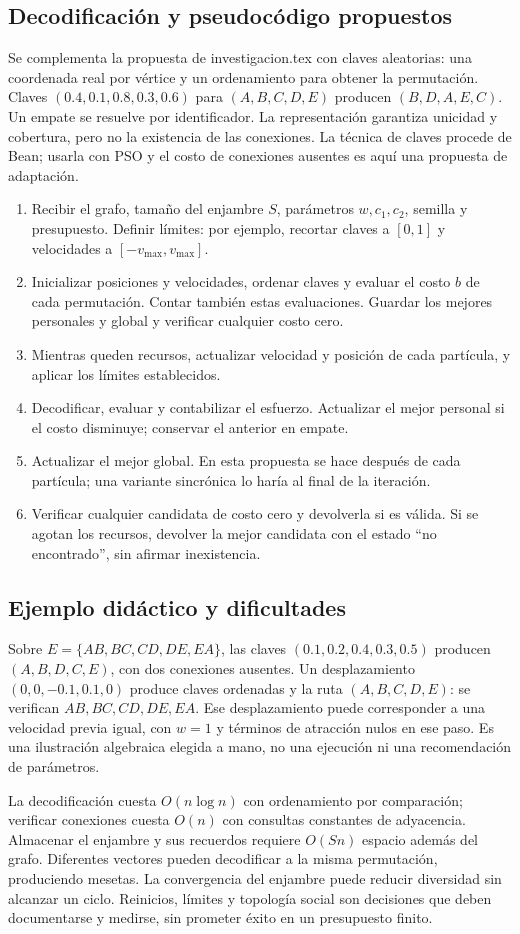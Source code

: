 \subsection{Decodificación y pseudocódigo propuestos}
Se complementa la propuesta de investigacion.tex con claves aleatorias: una coordenada real por vértice y un ordenamiento para obtener la permutación. Claves $(0.4,0.1,0.8,0.3,0.6)$ para $(A,B,C,D,E)$ producen $(B,D,A,E,C)$. Un empate se resuelve por identificador. La representación garantiza unicidad y cobertura, pero no la existencia de las conexiones. La técnica de claves procede de Bean; usarla con PSO y el costo de conexiones ausentes es aquí una propuesta de adaptación.\cite{de13}
\begin{enumerate}
\item Recibir el grafo, tamaño del enjambre $S$, parámetros $w,c_1,c_2$, semilla y presupuesto. Definir límites: por ejemplo, recortar claves a $[0,1]$ y velocidades a $[-v_{\max},v_{\max}]$.
\item Inicializar posiciones y velocidades, ordenar claves y evaluar el costo $b$ de cada permutación. Contar también estas evaluaciones. Guardar los mejores personales y global y verificar cualquier costo cero.
\item Mientras queden recursos, actualizar velocidad y posición de cada partícula, y aplicar los límites establecidos.
\item Decodificar, evaluar y contabilizar el esfuerzo. Actualizar el mejor personal si el costo disminuye; conservar el anterior en empate.
\item Actualizar el mejor global. En esta propuesta se hace después de cada partícula; una variante sincrónica lo haría al final de la iteración.
\item Verificar cualquier candidata de costo cero y devolverla si es válida. Si se agotan los recursos, devolver la mejor candidata con el estado ``no encontrado'', sin afirmar inexistencia.
\end{enumerate}

\subsection{Ejemplo didáctico y dificultades}
Sobre $E=\{AB,BC,CD,DE,EA\}$, las claves $(0.1,0.2,0.4,0.3,0.5)$ producen $(A,B,D,C,E)$, con dos conexiones ausentes. Un desplazamiento $(0,0,-0.1,0.1,0)$ produce claves ordenadas y la ruta $(A,B,C,D,E)$: se verifican $AB,BC,CD,DE,EA$. Ese desplazamiento puede corresponder a una velocidad previa igual, con $w=1$ y términos de atracción nulos en ese paso. Es una ilustración algebraica elegida a mano, no una ejecución ni una recomendación de parámetros.

La decodificación cuesta $O(n\log n)$ con ordenamiento por comparación; verificar conexiones cuesta $O(n)$ con consultas constantes de adyacencia. Almacenar el enjambre y sus recuerdos requiere $O(Sn)$ espacio además del grafo. Diferentes vectores pueden decodificar a la misma permutación, produciendo mesetas. La convergencia del enjambre puede reducir diversidad sin alcanzar un ciclo. Reinicios, límites y topología social son decisiones que deben documentarse y medirse, sin prometer éxito en un presupuesto finito.
